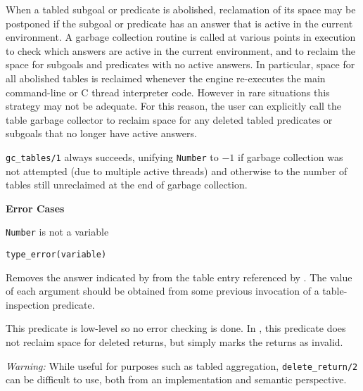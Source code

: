 \begin{description}
\begin{description}

%
When a tabled subgoal or predicate is abolished, reclamation of its
space may be postponed if the subgoal or predicate has an answer that
is active in the current environment.  A garbage collection routine is
called at various points in execution to check which answers are
active in the current environment, and to reclaim the space for
subgoals and predicates with no active answers.  In particular, space
for all abolished tables is reclaimed whenever the engine re-executes
the main command-line or C thread interpreter code.  However in rare
situations this strategy may not be adequate.  For this reason, the
user can explicitly call the table garbage collector to reclaim space
for any deleted tabled predicates or subgoals that no longer have
active answers.

{\tt gc\_tables/1} always succeeds, unifying {\tt Number} to $-1$ if
garbage collection was not attempted (due to multiple active threads)
and otherwise to the number of tables still unreclaimed at the end of
garbage collection.

{\bf Error Cases}
\bi
\item {\tt Number} is not a variable
\bi
\item 	{\tt type\_error(variable)}
\ei
\ei


%
Removes the answer indicated by  from the table
entry referenced by .  The value of each
argument should be obtained from some previous invocation of a
table-inspection predicate.

This predicate is low-level so no error checking is done.  In \version
, this predicate does not reclaim space for deleted returns, but
simply marks the returns as invalid.

{\em Warning: } While useful for purposes such as tabled aggregation,
{\tt delete\_return/2} can be difficult to use, both from an
implementation and semantic perspective.  


\end{description}
\end{description}
